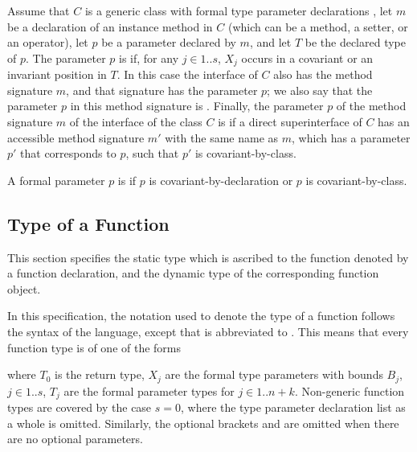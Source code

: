 \documentclass[makeidx]{article}
\begin{document}
\LMHash{}%
Assume that $C$ is a generic class with formal type parameter declarations
,
let $m$ be a declaration of an instance method in $C$
(which can be a method, a setter, or an operator),
let $p$ be a parameter declared by $m$, and
let $T$ be the declared type of $p$.
%
The parameter $p$ is
if, for any $j \in 1 .. s$,
$X_j$ occurs in a covariant or an invariant position in $T$.
%
In this case the interface of $C$ also has the method signature $m$,
and that signature has the parameter $p$;
we also say that the parameter $p$ in this method signature is
.
Finally, the parameter $p$ of the method signature $m$
of the interface of the class $C$ is
if a direct superinterface of $C$
has an accessible method signature $m'$ with the same name as $m$,
which has a parameter $p'$ that corresponds to $p$,
such that $p'$ is covariant-by-class.

\LMHash{}%
A formal parameter $p$ is
if $p$ is covariant-by-declaration or $p$ is covariant-by-class.



\subsection{Type of a Function}

\LMHash{}%
This section specifies the static type which is ascribed to
the function denoted by a function declaration,
and the dynamic type of the corresponding function object.

\LMHash{}%
In this specification,
the notation used to denote the type of a function follows
the syntax of the language, except that \EXTENDS{} is abbreviated to
\FunctionTypeExtends.
This means that every function type is of one of the forms

\noindent
where $T_0$ is the return type,
$X_j$ are the formal type parameters with bounds $B_j$, $j \in 1 .. s$,
$T_j$ are the formal parameter types for $j \in 1 .. n + k$.
Non-generic function types are covered by the case $s = 0$,
where the type parameter declaration list
\code{<\ldots{}>}
as a whole is omitted.
%
Similarly, the optional brackets \code{[]} and \code{\{\}} are omitted
when there are no optional parameters.
\end{document}
